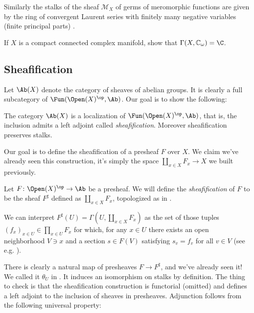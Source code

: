 \documentclass[11pt]{book}
\begin{document}
\begin{example} Similarly the stalks of the sheaf $\mathcal{M}_X$ of germs of meromorphic functions are given by the ring of convergent Laurent series with finitely many negative variables (finite principal parts) \cite[p.~42]{Forster}.
\end{example}

\begin{exercise} If $X$ is a compact connected complex manifold, show that $\Gamma(X, \mathbb{C}_\omega) = \C$.
\end{exercise}

\subsection{Sheafification}

Let $\Ab(X)$ denote the category of sheaves of abelian groups. It is clearly a full subcategory of $\Fun(\Open(X)^\op,\Ab)$. Our goal is to show the following:

\begin{theorem} The category $\Ab(X)$ is a localization of $\Fun(\Open(X)^\op,\Ab)$, that is, the inclusion admits a left adjoint called \emph{sheafification}. Moreover sheafification preserves stalks.
\end{theorem}

Our goal is to define the sheafification of a presheaf $F$ over $X$. We claim we've already seen this construction, it's simply the space $\amalg_{x\in X}F_x \to X$ we built previously.

\begin{definition}\label{def:sheafification}
Let $F \colon \Open(X)^\op \to \Ab$ be a presheaf. We will define the \emph{sheafification} of $F$ to be the sheaf $F^\sharp$ defined as $\amalg_{x\in X} F_x$, topologized as in .
\end{definition}

\begin{remark}\label{rmk:interpretation-of-sheafification}
We can interpret $F^\sharp(U) = \Gamma(U,\amalg_{x\in X}F_x)$ as the set of those tuples $(f_x)_{x\in U} \in \prod_{x\in U} F_x$ for which, for any $x\in U$ there exists an open neighborhood $V\ni x$ and a section $s\in F(V)$ satisfying $s_v = f_v$ for all $v\in V$ (see e.g. \cite[007X]{Stacks}).
\end{remark}

There is clearly a natural map of presheaves $F \to F^\sharp$, and we've already seen it! We called it $\theta_U$ in . It induces an isomorphism on stalks by definition. The thing to check is that the sheafification construction is functorial (omitted) and defines a left adjoint to the inclusion of sheaves in presheaves. Adjunction follows from the following universal property:
\end{document}
